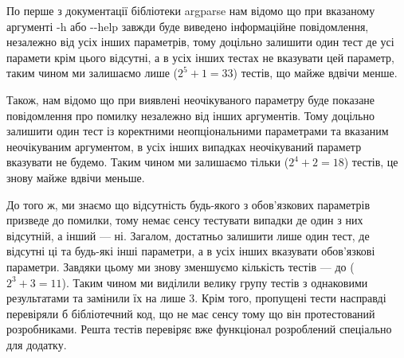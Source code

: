 \documentclass[14pt]{extarticle}
\begin{document}
  По перше з документації бібліотеки argparse нам відомо що при вказаному
  аргументі -h або -{}-help завжди буде виведено інформаційне повідомлення,
  незалежно від усіх інших параметрів, тому доцільно залишити
  один тест де усі парамети крім цього відсутні,
  а в усіх інших тестах не вказувати цей параметр,
  таким чином ми залишаємо лише ($2^5 + 1= 33$) тестів, що майже вдвічи менше.

  Також, нам відомо що при виявлені неочікуваного параметру
  буде показане повідомлення про помилку незалежно від інших аргументів.
  Тому доцільно залишити один тест із коректними неопціональними параметрами
  та вказаним неочікуваним аргументом,
  в усіх інших випадках неочікуваний параметр вказувати не будемо.
  Таким чином ми залишаємо тільки ($2^4+2=18$) тестів,
  це знову майже вдвічи меньше.

  До того ж, ми знаємо що відсутність будь-якого
  з обов'язкових параметрів призведе до помилки,
  тому немає сенсу тестувати випадки де один з них відсутній,
  а інший --- ні.
  Загалом, достатньо залишити лише один тест, де
  відсутні ці та будь-які інші параметри,
  а в усіх інших вказувати обов'язкові параметри.
  Завдяки цьому ми знову зменшуємо кількість тестів --- до ($2^3+3=11$).
  Таким чином ми виділили велику групу тестів з однаковими результатами
  та замінили їх на лише 3. Крім того, пропущені тести насправді перевіряли
  б бібліотечний код, що не має сенсу тому що він протестований розробниками.
  Решта тестів перевіряє вже функціонал розроблений спеціально для додатку.
\end{document}
